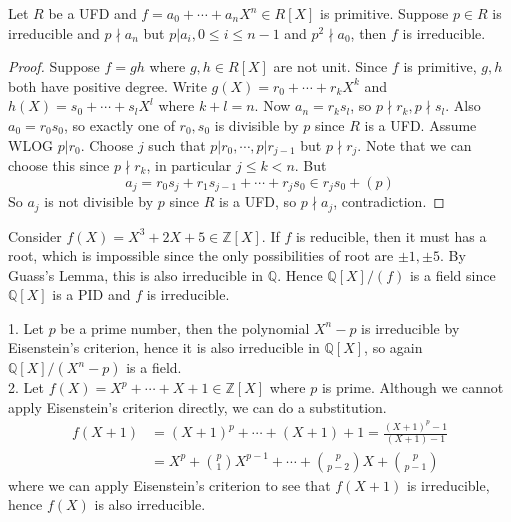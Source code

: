 \begin{theorem}
    Let $R$ be a UFD and $f=a_0+\cdots+a_nX^n\in R[X]$ is primitive.
    Suppose $p\in R$ is irreducible and $p\nmid a_n$ but $p|a_i,0\le i\le n-1$ and $p^2\nmid a_0$, then $f$ is irreducible.
\end{theorem}
\begin{proof}
    Suppose $f=gh$ where $g,h\in R[X]$ are not unit.
    Since $f$ is primitive, $g,h$ both have positive degree.
    Write $g(X)=r_0+\cdots+r_kX^k$ and $h(X)=s_0+\cdots+s_lX^l$ where $k+l=n$.
    Now $a_n=r_ks_l$, so $p\nmid r_k,p\nmid s_l$.
    Also $a_0=r_0s_0$, so exactly one of $r_0,s_0$ is divisible by $p$ since $R$ is a UFD.
    Assume WLOG $p|r_0$.
    Choose $j$ such that $p|r_0,\cdots,p|r_{j-1}$ but $p\nmid r_j$.
    Note that we can choose this since $p\nmid r_k$, in particular $j\le k<n$.
    But
    $$a_j=r_0s_j+r_1s_{j-1}+\cdots+r_js_0\in r_js_0+(p)$$
    So $a_j$ is not divisible by $p$ since $R$ is a UFD, so $p\nmid a_j$, contradiction.
\end{proof}
\begin{example}
    Consider $f(X)=X^3+2X+5\in\mathbb Z[X]$.
    If $f$ is reducible, then it must has a root, which is impossible since the only possibilities of root are $\pm 1,\pm 5$.
    By Guass's Lemma, this is also irreducible in $\mathbb Q$.
    Hence $\mathbb Q[X]/(f)$ is a field since $\mathbb Q[X]$ is a PID and $f$ is irreducible.
\end{example}
\begin{example}
    1. Let $p$ be a prime number, then the polynomial $X^n-p$ is irreducible by Eisenstein's criterion, hence it is also irreducible in $\mathbb Q[X]$, so again $\mathbb Q[X]/(X^n-p)$ is a field.\\
    2. Let $f(X)=X^p+\cdots+X+1\in\mathbb Z[X]$ where $p$ is prime.
    Although we cannot apply Eisenstein's criterion directly, we can do a substitution.
    \begin{align*}
        f(X+1)&=(X+1)^p+\cdots+(X+1)+1=\frac{(X+1)^p-1}{(X+1)-1}\\
        &=X^p+\binom{p}{1}X^{p-1}+\cdots+\binom{p}{p-2}X+\binom{p}{p-1}
    \end{align*}
    where we can apply Eisenstein's criterion to see that $f(X+1)$ is irreducible, hence $f(X)$ is also irreducible.
\end{example}